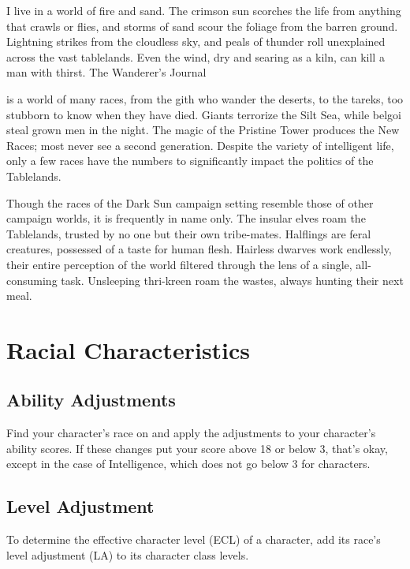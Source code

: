 {I live in a world of fire and sand. The crimson sun scorches the life from anything that crawls or flies, and storms of sand scour the foliage from the barren ground. Lightning strikes from the cloudless sky, and peals of thunder roll unexplained across the vast tablelands. Even the wind, dry and searing as a kiln, can kill a man with thirst.}
{The Wanderer's Journal}

 is a world of many races, from the gith who wander the deserts, to the tareks, too stubborn to know when they have died. Giants terrorize the Silt Sea, while belgoi steal grown men in the night. The magic of the Pristine Tower produces the New Races; most never see a second generation. Despite the variety of intelligent life, only a few races have the numbers to significantly impact the politics of the Tablelands.

Though the races of the {\tableheader Dark Sun} campaign setting resemble those of other campaign worlds, it is frequently in name only. The insular elves roam the Tablelands, trusted by no one but their own tribe-mates. Halflings are feral creatures, possessed of a taste for human flesh. Hairless dwarves work endlessly, their entire perception of the world filtered through the lens of a single, all-consuming task. Unsleeping thri-kreen roam the wastes, always hunting their next meal.

\section{Racial Characteristics}

\subsection{Ability Adjustments}

Find your character's race on  and apply the adjustments to your character's ability scores. If these changes put your score above 18 or below 3, that's okay, except in the case of Intelligence, which does not go below 3 for characters.

\subsection{Level Adjustment}

To determine the effective character level (ECL) of a character, add its race's level adjustment (LA) to its character class levels.

